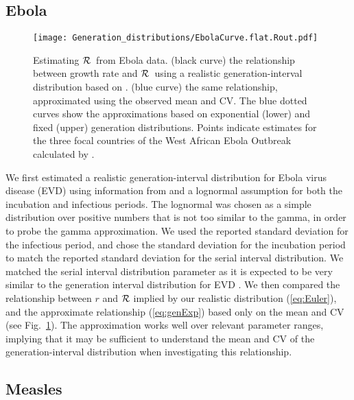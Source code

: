 \documentclass[12pt,]{article}
\newcommand{\RR}{\ensuremath{{\cal R}}}
\newcommand{\eref}[1]{(\ref{eq:#1})}
\newcommand{\fref}[1]{Fig.~\ref{fig:#1}}
\begin{document}
\subsection{Ebola}

\begin{figure}[htbp] \centering
	\texttt{[image: Generation\_distributions/EbolaCurve.flat.Rout.pdf]}
	\caption{Estimating \RR~from Ebola data.
(black curve) the relationship between growth rate and \RR~using a realistic generation-interval distribution based on \cite{WHO14}.
(blue curve) the same relationship, approximated using the observed mean and CV. 
The blue dotted curves show the approximations based on exponential (lower) and fixed (upper) generation distributions.
Points indicate estimates for the three focal countries of the West African Ebola Outbreak calculated by \cite{WHO14}.
	\label{fig:EbolaCurve}}
\end{figure}

We first estimated a realistic generation-interval distribution for Ebola virus disease (EVD) using information from \cite{WHO14} and a lognormal assumption for both the incubation and infectious periods.
The lognormal was chosen as a simple distribution over positive numbers that is not too similar to the gamma, in order to probe the gamma approximation.
We used the reported standard deviation for the infectious period, and chose the standard deviation for the incubation period to match the reported standard deviation for the serial interval distribution.
We matched the serial interval distribution parameter as it is expected to be very similar to the generation interval distribution for EVD \cite{WHO14}.
We  then compared the relationship between $r$ and $\RR$ implied by our realistic distribution \eref{Euler}, and the approximate relationship \eref{genExp} based only on the mean and CV (see \fref{EbolaCurve}). The approximation works well over relevant parameter ranges, implying that it may be sufficient to understand the mean and CV of the generation-interval distribution when investigating this relationship.

\subsection{Measles}
\end{document}

